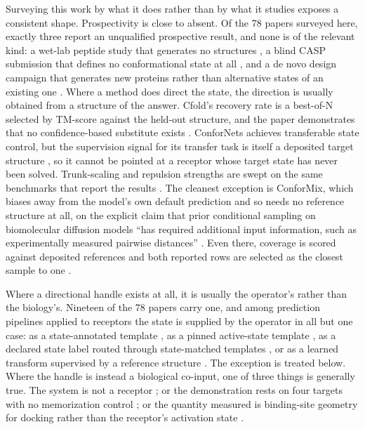 Surveying this work by what it does rather than by what it studies exposes a consistent shape.
Prospectivity is close to absent. Of the 78 papers surveyed here, exactly three report an
unqualified prospective result, and none is of the relevant kind: a wet-lab peptide study that
generates no structures \citep{tran2026nanogs}, a blind CASP submission that defines no conformational
state at all \citep{wallner2023afsample}, and a de novo design campaign that generates new proteins rather
than alternative states of an existing one \citep{ingraham2023chroma}. Where a method does direct the state, the
direction is usually obtained from a structure of the answer. Cfold's recovery rate is a best-of-N
selected by TM-score against the held-out structure, and the paper demonstrates that no
confidence-based substitute exists \citep[p.~5]{bryant2024cfold}. ConforNets achieves transferable state
control, but the supervision signal for its transfer task is itself a deposited target structure
\citep{lee2026confornets}, so it cannot be pointed at a receptor whose target state has never been
solved. Trunk-scaling and repulsion strengths are swept on the same benchmarks that report the
results \citep{suzuki2026pairscaling,suzuki2026conforflux}. The cleanest exception is ConforMix, which
biases away from the model's own default prediction and so needs no reference structure at all, on
the explicit claim that prior conditional sampling on biomolecular diffusion models ``has required
additional input information, such as experimentally measured pairwise distances''
\citep[p.~2]{richman2025conformix}. Even there, coverage is scored against deposited references and both
reported rows are selected as the closest sample to one \citep[p.~6]{richman2025conformix}.

Where a directional handle exists at all, it is usually the operator's rather than the biology's.
Nineteen of the 78 papers carry one, and among prediction pipelines applied to receptors the state
is supplied by the operator in all but one case: as a state-annotated template \citep{heo2022multistate},
as a pinned active-state template \citep{ferguson2026deorphann}, as a declared state label routed through
state-matched templates \citep{yang2025statespecific}, or as a learned transform supervised by a
reference structure \citep{lee2026confornets}. The exception is treated below. Where the handle is
instead a biological co-input, one of three things is generally true. The system is not a receptor
\citep{lazou2026cryptic,purnomo2026cafe,richman2025conformix}; or the demonstration rests on four
targets with no memorization control \citep{ye2026multistatebias}; or the quantity measured is
binding-site geometry for docking rather than the receptor's activation state
\citep{mitjavila2026afsample2t}.

